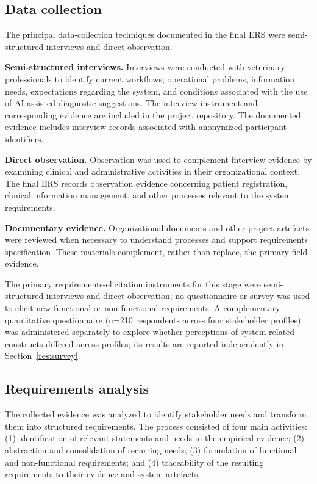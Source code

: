 \documentclass[pdflatex,sn-mathphys-num,Numbered]{sn-jnl}
\begin{document}
\subsection{Data collection}\label{subsec4}

The principal data-collection techniques documented in the final ERS were semi-structured interviews and direct observation.

\textbf{Semi-structured interviews.} Interviews were conducted with veterinary professionals to identify current workflows, operational problems, information needs, expectations regarding the system, and conditions associated with the use of AI-assisted diagnostic suggestions. The interview instrument and corresponding evidence are included in the project repository. The documented evidence includes interview records associated with anonymized participant identifiers.

\textbf{Direct observation.} Observation was used to complement interview evidence by examining clinical and administrative activities in their organizational context. The final ERS records observation evidence concerning patient registration, clinical information management, and other processes relevant to the system requirements.

\textbf{Documentary evidence.} Organizational documents and other project artefacts were reviewed when necessary to understand processes and support requirements specification. These materials complement, rather than replace, the primary field evidence.

The primary requirements-elicitation instruments for this stage were semi-structured interviews and direct observation; no questionnaire or survey was used to elicit new functional or non-functional requirements. A complementary quantitative questionnaire (n=210 respondents across four stakeholder profiles) was administered separately to explore whether perceptions of system-related constructs differed across profiles; its results are reported independently in Section~\ref{res:survey}.

\subsection{Requirements analysis}\label{subsec5}

The collected evidence was analyzed to identify stakeholder needs and transform them into structured requirements. The process consisted of four main activities: (1) identification of relevant statements and needs in the empirical evidence; (2) abstraction and consolidation of recurring needs; (3) formulation of functional and non-functional requirements; and (4) traceability of the resulting requirements to their evidence and system artefacts.
\end{document}
